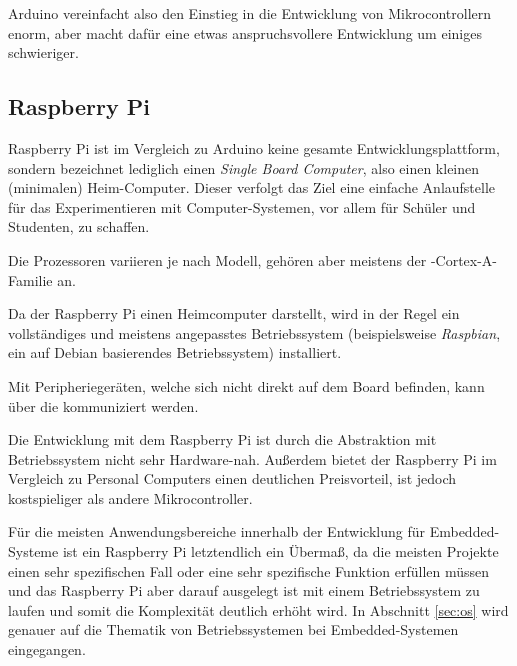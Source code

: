 		Arduino vereinfacht also den Einstieg in die Entwicklung von Mikrocontrollern enorm, aber macht dafür eine
		etwas anspruchsvollere Entwicklung um einiges schwieriger.

		\subsection{Raspberry Pi}
        Raspberry Pi ist im Vergleich zu Arduino keine gesamte Entwicklungsplattform, sondern bezeichnet lediglich
        einen \textit{Single Board Computer}, also einen kleinen (minimalen) Heim-Computer. Dieser verfolgt das Ziel eine
        einfache Anlaufstelle für das Experimentieren mit Computer-Systemen, vor allem für Schüler und
        Studenten, zu schaffen.

        Die Prozessoren variieren je nach Modell, gehören aber meistens der -Cortex-A-Familie an.

        Da der Raspberry Pi einen Heimcomputer darstellt, wird in der Regel ein vollständiges und meistens angepasstes
        Betriebssystem (beispielsweise \textit{Raspbian}, ein auf Debian basierendes Betriebssystem) installiert.

        Mit Peripheriegeräten, welche sich nicht direkt auf dem Board befinden, kann über die 
        kommuniziert werden.

        Die Entwicklung mit dem Raspberry Pi ist durch die Abstraktion mit Betriebssystem nicht sehr Hardware-nah.
        Außerdem bietet der Raspberry Pi im Vergleich zu Personal Computers einen deutlichen Preisvorteil, ist jedoch
        kostspieliger als andere Mikrocontroller.

        Für die meisten Anwendungsbereiche innerhalb der Entwicklung für Embedded-Systeme ist ein Raspberry Pi
        letztendlich ein Übermaß, da die meisten Projekte einen sehr spezifischen Fall oder eine sehr spezifische
        Funktion erfüllen müssen und das Raspberry Pi aber darauf ausgelegt ist mit einem Betriebssystem zu
        laufen und somit die Komplexität deutlich erhöht wird. In Abschnitt \ref{sec:os} wird genauer auf die Thematik
        von Betriebssystemen bei Embedded-Systemen eingegangen.

